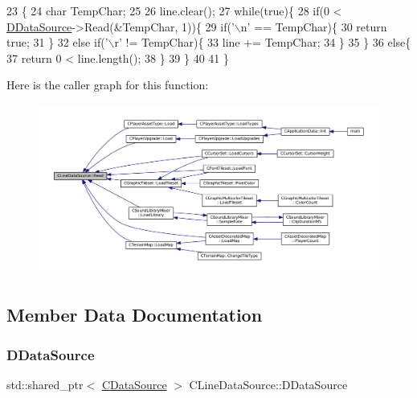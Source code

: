 \begin{DoxyCode}
23                                          \{
24     \textcolor{keywordtype}{char} TempChar;
25     
26     line.clear();
27     \textcolor{keywordflow}{while}(\textcolor{keyword}{true})\{
28         \textcolor{keywordflow}{if}(0 < \hyperlink{classCLineDataSource_a976b7e02379cb8b29eb16cfedd1352cb}{DDataSource}->Read(&TempChar, 1))\{
29             \textcolor{keywordflow}{if}(\textcolor{charliteral}{'\(\backslash\)n'} == TempChar)\{
30                 \textcolor{keywordflow}{return} \textcolor{keyword}{true};
31             \}
32             \textcolor{keywordflow}{else} \textcolor{keywordflow}{if}(\textcolor{charliteral}{'\(\backslash\)r'} != TempChar)\{
33                 line += TempChar;
34             \}
35         \}
36         \textcolor{keywordflow}{else}\{
37             \textcolor{keywordflow}{return} 0 < line.length();
38         \}
39     \}
40     
41 \}
\end{DoxyCode}
Here is the caller graph for this function\+:\nopagebreak
\begin{figure}[H]
\begin{center}
\leavevmode
\includegraphics[width=350pt]{classCLineDataSource_a569f5a9732d73ac8813c0ba4860e2e66_icgraph}
\end{center}
\end{figure}


\subsection{Member Data Documentation}
\hypertarget{classCLineDataSource_a976b7e02379cb8b29eb16cfedd1352cb}{}\label{classCLineDataSource_a976b7e02379cb8b29eb16cfedd1352cb} 
\subsubsection{\texorpdfstring{D\+Data\+Source}{DDataSource}}
{\footnotesize\ttfamily std\+::shared\+\_\+ptr$<$ \hyperlink{classCDataSource}{C\+Data\+Source} $>$ C\+Line\+Data\+Source\+::\+D\+Data\+Source\hspace{0.3cm}{\ttfamily [protected]}}



